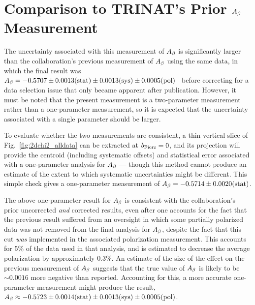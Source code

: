 %


\section{Comparison to TRINAT's Prior $A_{\beta}$ Measurement}
\label{sec:compare_Abeta}
The uncertainty associated with this measurement of $A_{\beta}$ is significantly larger than the collaboration's previous measurement of $A_{\beta}$ using the same data, in which the final result was $\mbox{$A_{\beta} = -0.5707 \pm 0.0013(\textrm{stat}) \pm 0.0013(\textrm{sys}) \pm 0.0005(\textrm{pol})$}$~\cite{ben_Abeta} before correcting for a data selection issue that only became apparent after publication.  However, it must be noted that the present measurement is a two-parameter measurement rather than a one-parameter measurement, so it is expected that the uncertainty associated with a single parameter should be larger.

To evaluate whether the two measurements are consistent, a thin vertical slice of Fig.~\ref{fig:2dchi2_alldata} can be extracted at $b_{\mathrm{Fierz}}=0$, and its projection will provide the centroid (including systematic offsets) and statistical error associated with a one-parameter analysis for $A_{\beta}$ --- though this method cannot produce an estimate of the extent to which systematic uncertainties might be different.  This simple check gives a one-parameter measurement of $A_{\beta} = -0.5714 \pm 0.0020(\textrm{stat})$.

The above one-parameter result for $A_{\beta}$ is consistent with the collaboration's prior uncorrected \emph{and} corrected results, even after one accounts for the fact that the previous result suffered from an oversight in which some partially polarized data was not removed from the final analysis for $A_{\beta}$, despite the fact that this cut \emph{was} implemented in the associated polarization measurement.  This accounts for $5\%$ of the data used in that analysis, and is estimated to decrease the average polarization by approximately $0.3\%$.  
An estimate of the size of the effect on the previous measurement of $A_{\beta}$ suggests that the true value of $A_{\beta}$ is likely to be $\sim 0.0016$ more negative than reported.  
Accounting for this, a more accurate one-parameter measurement might produce the result, $\mbox{$A_{\beta} \approx -0.5723 \pm 0.0014(\textrm{stat}) \pm 0.0013(\textrm{sys}) \pm 0.0005(\textrm{pol})$}$.



